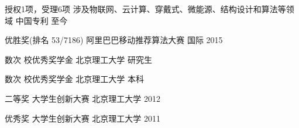 




\begin{cvhonors}

\cvhonor
{授权1项，受理6项} %
{涉及物联网、云计算、穿戴式、微能源、结构设计和算法等领域} %
{中国专利} %
{至今} %

\cvhonor
{优胜奖(排名 53/7186)} %
{阿里巴巴移动推荐算法大赛} %
{ 国际} %
{2015} %

\cvhonor
{数次} %
{校优秀奖学金} %
{北京理工大学} %
{研究生} %


\cvhonor
{数次} %
{校优秀奖学金} %
{北京理工大学} %
{本科} %


\cvhonor
{二等奖} %
{大学生创新大赛} %
{北京理工大学} %
{2012} %

\cvhonor
{优秀奖} %
{大学生创新大赛} %
{北京理工大学} %
{2011} %






\end{cvhonors}
